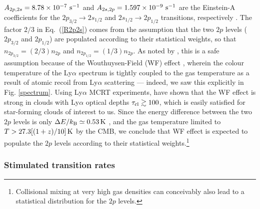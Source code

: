\documentclass[fleqn,usenatbib]{mnras}
\begin{document}
$A_{2p,2s} = 8.78 \times 10^{-7} ~ \rm s^{-1}$ and $A_{2s,2p} = 1.597 \times 10^{-9} ~ \rm s^{-1}$ are the Einstein-A coefficients for the $2p_{3/2} \rightarrow 2s_{1/2}$ and $2s_{1/2} \rightarrow 2p_{1/2}$ transitions, respectively \citep{Dennison2005}. The factor $2/3$ in Eq.~(\ref{R2p2s}) comes from the assumption that the two $2p$ levels ($2p_{3/2}$ and $2p_{1/2}$) are populated according to their statistical weights, so that $n_{2p_{3/2}} = (2/3)n_{2p}$ and $n_{2p_{1/2}} = (1/3)n_{2p}$. As noted by \cite{Dijkstra2016}, this is a safe assumption because of the Wouthuysen-Field (WF) effect \citep{Wouthuysen1952, Field1958, Field1959}, wherein the colour temperature of the Ly$\alpha$ spectrum is tightly coupled to the gas temperature as a result of atomic recoil from Ly$\alpha$ scattering --- indeed, we saw this explicitly in Fig. \ref{spectrum}. Using Ly$\alpha$ MCRT experiments, \cite{Seon2020} have shown that the WF effect is strong in clouds with Ly$\alpha$ optical depths $\tau_{\rm cl} \gtrsim 100$, which is easily satisfied for star-forming clouds of interest to us. Since the energy difference between the two $2p$ levels is only $\Delta E/k_{\rm B} \simeq 0.53\,\rm K$ \citep{Dennison2005}, and the gas temperature limited to $T > 27.3 [(1+z)/10]\,\rm K$ by the CMB, we conclude that WF effect is expected to populate the $2p$ levels according to their statistical weights.\footnote{Collisional mixing at very high gas densities can conceivably also lead to a statistical distribution for the $2p$ levels. } 


\subsubsection{Stimulated transition rates}
\end{document}
